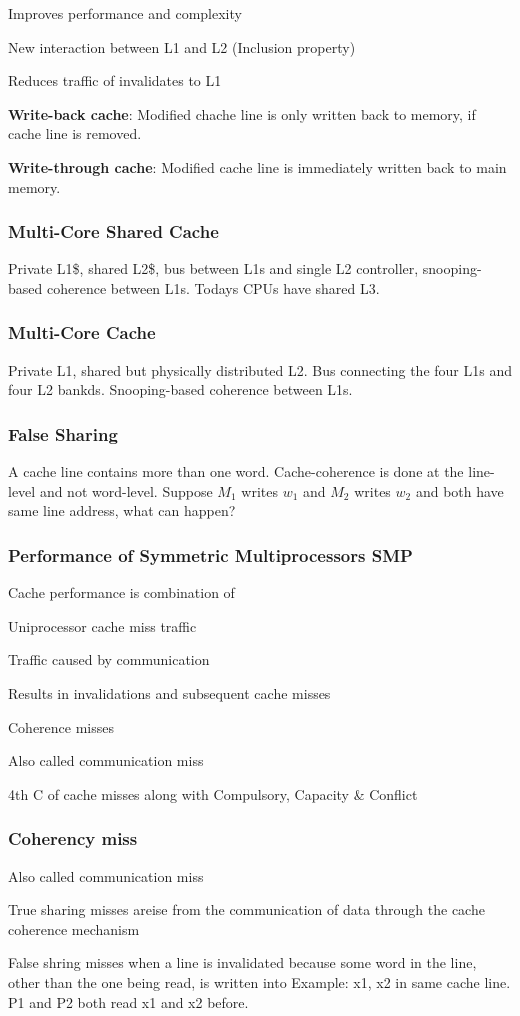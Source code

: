 \documentclass[a4paper, fontsize=8pt, landscape, DIV=1]{scrartcl}
\makeatletter
\renewenvironment{outline}[1][]{%
  \ifthenelse{\equal{#1}{}}{}{\renewcommand{\ol@type}{#1}}%
  \ol@z%
  \newcommand{\0}{\ol@toz\ol@z}%
  \newcommand{\1}{\vspace{\dimexpr\outlinespacingscalar\baselineskip-\baselineskip}\ol@toi\ol@i\item}%
  \newcommand{\2}{\vspace{\dimexpr\outlinespacingscalartwo\baselineskip-\baselineskip}\ol@toii\ol@ii\item}%
  \newcommand{\3}{\vspace{\dimexpr\outlinespacingscalar\baselineskip-\baselineskip}\ol@toiii\ol@iii\item}%
  \newcommand{\4}{\vspace{\dimexpr\outlinespacingscalar\baselineskip-\baselineskip}\ol@toiiii\ol@iiii\item}%
}{%
  \ol@toz\ol@exit%
}
\def\outlinespacingscalar{0.5}
\def\outlinespacingscalartwo{0.5}
\makeatother
\begin{document}
\begin{multicols*}{4}
  \begin{outline}
    \1 Improves performance and complexity
    \1 New interaction between L1 and L2 (Inclusion property)
    \1 Reduces traffic of invalidates to L1
  \end{outline}

  \textbf{Write-back cache}: Modified chache line is only written back to memory, if cache
  line is removed.

  \textbf{Write-through cache}: Modified cache line is immediately written back to main
  memory.

  \subsubsection{Multi-Core Shared Cache}
  Private L1\$, shared L2\$, bus between L1s and single L2 controller, snooping-based
  coherence between L1s. Todays CPUs have shared L3.

  \subsubsection{Multi-Core Cache}
  Private L1, shared but physically distributed L2. Bus connecting the four L1s
  and four L2 bankds. Snooping-based coherence between L1s.

  \subsubsection{False Sharing}
  A cache line contains more than one word. Cache-coherence is done at the line-level
  and not word-level. Suppose $M_1$ writes $w_1$ and $M_2$ writes $w_2$ and both
  have same line address, what can happen?

  \subsubsection{Performance of Symmetric Multiprocessors SMP}
  Cache performance is combination of 
  \begin{outline}
    \1 Uniprocessor cache miss traffic
    \1 Traffic caused by communication
      \2 Results in invalidations and subsequent cache misses
    \1 Coherence misses
      \2 Also called communication miss
      \2 4th C of cache misses along with Compulsory, Capacity \& Conflict
  \end{outline}

  \subsubsection{Coherency miss}
  Also called communication miss
  \begin{outline}
    \1 True sharing misses areise from the communication of data through the cache 
    coherence mechanism
    \1 False shring misses when a line is invalidated because some word in the line,
    other than the one being read, is written into
  \end{outline}
  Example: x1, x2 in same cache line. P1 and P2 both read x1 and x2 before.



\end{multicols*}
\end{document}
